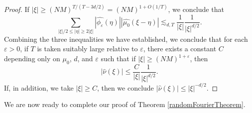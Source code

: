 \documentclass[12pt,reqno]{article}
\begin{document}
\begin{proof}
    If $|\xi| \geq (NM)^{T/(T - 3d/2)} = (NM)^{1 + O(1/T)}$, we conclude that
    \[ \sum_{|\xi|/2 \leq |\eta| \geq 2 |\xi|} |\widehat{\phi_\varepsilon}(\eta)| |\widehat{\mu_0}(\xi-\eta)| \lesssim_{d,T} \frac{1}{|\xi|} \frac{1}{|\xi|^{d/2}}. \]
    Combining the three inequalities we have established, we conclude that for each $\varepsilon > 0$, if $T$ is taken suitably large relative to $\varepsilon$, there exists a constant $C$ depending only on $\mu_0$, $d$, and $\varepsilon$ such that if $|\xi| \geq (NM)^{1 + \varepsilon}$, then
    \[ |\widehat{\nu}(\xi)| \leq \frac{C}{|\xi|} \frac{1}{|\xi|^{d/2}}. \]
    If, in addition, we take $|\xi| \geq C$, then we conclude $|\widehat{\nu}(\xi)| \leq |\xi|^{-d/2}$.
\end{proof}

We are now ready to complete our proof of Theorem \ref{randomFourierTheorem}.
\end{document}
